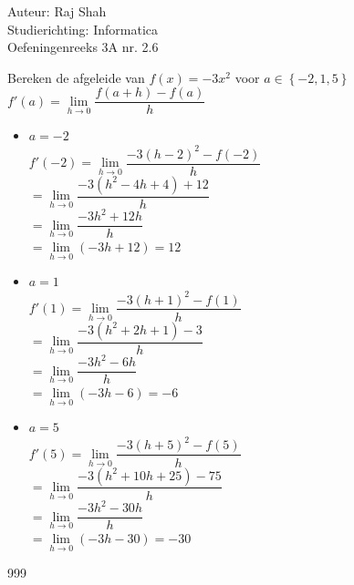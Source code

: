 \documentclass[a4paper]{article}
\begin{document}
  
\noindent \large Auteur: Raj Shah \\
\noindent \large Studierichting: Informatica\\
\noindent \large Oefeningenreeks 3A nr. 2.6\\

\medskip

\normalsize

Bereken de afgeleide van $f(x) = -3x^2$ voor $a \in \left\{-2, 1, 5\right\}$\\

$f'(a) = \lim\limits_{h\rightarrow 0} \dfrac{f(a+h) - f(a)}{h} $\\
\begin{itemize}
	\item $a = -2$\\

$f'(-2) = \lim\limits_{h\rightarrow 0} \dfrac{-3(h-2)^2 - f(-2)}{h} $\\

	$ = \lim\limits_{h\rightarrow 0} \dfrac{-3(h^2 -4h + 4) + 12}{h}$\\
	
	$ = \lim\limits_{h\rightarrow 0} \dfrac{-3h^2 +12h}{h}$\\ 
	
	$ = \lim\limits_{h\rightarrow 0} (-3h + 12) = 12$\\

	\item $a = 1$\\

$f'(1) = \lim\limits_{h\rightarrow 0} \dfrac{-3(h+1)^2 - f(1)}{h} $\\

	$ = \lim\limits_{h\rightarrow 0} \dfrac{-3(h^2 + 2h +1) -3}{h}$\\
	
	$ = \lim\limits_{h\rightarrow 0} \dfrac{-3h^2 -6h}{h}$\\
	
	$ = \lim\limits_{h\rightarrow 0} (-3h - 6) = -6 $\\
	
	\item $a = 5$\\

$f'(5) = \lim\limits_{h\rightarrow 0} \dfrac{-3(h+5)^2 - f(5)}{h} $\\

	$ = \lim\limits_{h\rightarrow 0} \dfrac{-3(h^2 + 10h + 25) -75}{h}$\\
	
	$ = \lim\limits_{h\rightarrow 0} \dfrac{-3h^2 - 30h}{h}$\\
	
	$ = \lim\limits_{h\rightarrow 0} (-3h -30) = -30$\\

\end{itemize}

\begin{thebibliography}{999}
\end{thebibliography}
\end{document}
